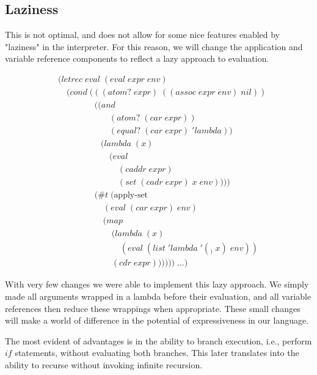 \subsection{Laziness}
This is not optimal, and does not allow for some nice features enabled by 
"laziness" in the interpreter. For this reason, we will change the 
application and variable reference components to reflect a lazy approach to 
evaluation.

\begin{figure}[htp]
\footnotesize
\caption{}\label{fig:lazinessEval}
\begin{align*}
& (letrec \; eval \; (eval \; expr \; env)
\\& \quad (cond \; (((atom? \; expr) \; ((assoc \; expr \; env) \; nil))
\\& \qquad \qquad \; ((and \; 
\\& \qquad \qquad \qquad (atom? \; (car \; expr)) \; 
\\& \qquad \qquad \qquad (equal? \; (car \; expr) \; 'lambda)) \; 
\\& \qquad \qquad \quad (lambda \; (x) \; 
\\& \qquad \qquad \qquad (eval \; 
\\& \qquad \qquad \qquad \quad (caddr \; expr) \; 
\\& \qquad \qquad \qquad \quad (set \; (cadr \; expr) \; x \; env))))
\\& \qquad \qquad \; (\#t \; (\text{apply-set} \; 
\\& \qquad \qquad \quad \; (eval \; (car \; expr) \; env) \; 
\\& \qquad \qquad \quad \; (map \; 
\\& \qquad \qquad \qquad \; (lambda \; (x) \; 
\\& \qquad \qquad \qquad \quad \; (eval \; (list \; 'lambda \; '(_) \; x) \; env)) \; 
\\& \qquad \qquad \qquad \; (cdr \; expr)))))) \; \dots)
\end{align*}
\end{figure}

With very few changes we were able to implement this lazy approach. We simply 
made all arguments wrapped in a lambda before their evaluation, and all 
variable references then reduce these wrappings when appropriate. These small 
changes will make a world of difference in the potential of expressiveness in 
our language.

The most evident of advantages is in the ability to branch execution, i.e., 
perform $if$ statements, without evaluating both branches. This later 
translates into the ability to recurse without invoking infinite recursion.

